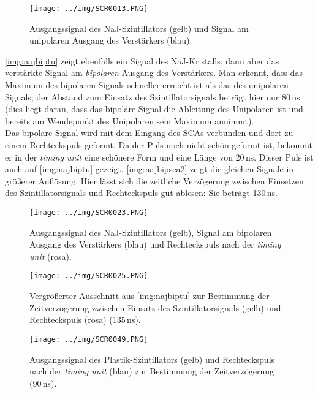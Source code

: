 \begin{figure}[H]
\begin{center}
  \texttt{[image: ../img/SCR0013.PNG]}
  \caption[---]{Ausgangssignal des NaJ-Szintillators (gelb) und Signal am unipolaren Ausgang des Verstärkers (blau).}
  \label{img:najunip}
\end{center}
\end{figure}

\autoref{img:najbiptu} zeigt ebenfalls ein Signal des NaJ-Kristalls,
dann aber das verstärkte Signal am \emph{bipolaren} Ausgang des Verstärkers.
Man erkennt, dass das Maximum des bipolaren Signals schneller erreicht ist als das des unipolaren Signals;
der Abstand zum Einsatz des Szintillatorsignals beträgt hier nur 80\,ns (dies liegt daran,
dass das bipolare Signal die Ableitung des Unipolaren ist und bereits am Wendepunkt des Unipolaren sein Maximum
annimmt).\\
Das bipolare Signal wird mit dem Eingang des SCAs verbunden und dort zu einem Rechteckspuls geformt.
Da der Puls noch nicht schön geformt ist, bekommt er in der \emph{timing unit} eine schönere Form und eine Länge von
20\,ns. Dieser Puls ist auch auf \autoref{img:najbiptu} gezeigt.
\autoref{img:najbipsca2} zeigt die gleichen Signale in größerer Auflösung.
Hier lässt sich die zeitliche Verzögerung zwischen Einsetzen des Szintillatorsignals und Rechteckspuls
gut ablesen: Sie beträgt 130\,ns.

\begin{figure}[H]
\begin{center}
  \texttt{[image: ../img/SCR0023.PNG]}
  \caption[---]{Ausgangssignal des NaJ-Szintillators (gelb),
  Signal am bipolaren Ausgang des Verstärkers (blau)
  und Rechteckspuls nach der \emph{timing unit} (rosa).}
  \label{img:najbiptu}
\end{center}
\end{figure}

\begin{figure}[H]
\begin{center}
  \texttt{[image: ../img/SCR0025.PNG]}
  \caption[---]{Vergrößerter Ausschnitt aus \autoref{img:najbiptu} zur Bestimmung der Zeitverzögerung zwischen
  Einsatz des Szintillatorsignals (gelb) und Rechteckspuls (rosa) (135\,ns).}
  \label{img:najbipsca2}
\end{center}
\end{figure}

\begin{figure}[H]
\begin{center}
  \texttt{[image: ../img/SCR0049.PNG]}
  \caption[---]{Ausgangssignal des Plastik-Szintillators (gelb) und
  Rechteckspuls nach der \emph{timing unit} (blau) zur Bestimmung der Zeitverzögerung (90\,ns).}
  \label{img:plastiktu}
\end{center}
\end{figure}


